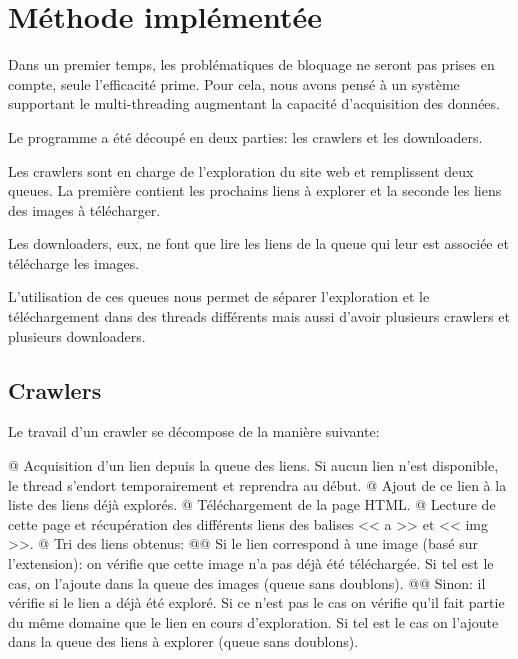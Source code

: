 \documentclass[hideweeklyreports,noposter]{polytech/polytech}
\begin{document}
		\section{Méthode implémentée}
			Dans un premier temps, les problématiques de bloquage ne seront pas prises en compte, seule l'efficacité prime.
			Pour cela, nous avons pensé à un système supportant le multi-threading augmentant la capacité d'acquisition des données.
			
			Le programme a été découpé en deux parties: les crawlers et les downloaders.
			
			Les crawlers sont en charge de l'exploration du site web et remplissent deux queues.
			La première contient les prochains liens à explorer et la seconde les liens des images à télécharger.
			
			Les downloaders, eux, ne font que lire les liens de la queue qui leur est associée et télécharge les images.
			
			L'utilisation de ces queues nous permet de séparer l'exploration et le téléchargement dans des threads différents mais aussi d'avoir plusieurs crawlers et plusieurs downloaders.
			
			\subsection{Crawlers}
				Le travail d'un crawler se décompose de la manière suivante:
				\begin{easylist}
					@ Acquisition d'un lien depuis la queue des liens.
					Si aucun lien n'est disponible, le thread s'endort temporairement et reprendra au début.
					@ Ajout de ce lien à la liste des liens déjà explorés.
					@ Téléchargement de la page HTML.
					@ Lecture de cette page et récupération des différents liens des balises << a >> et << img >>.
					@ Tri des liens obtenus:
					@@ Si le lien correspond à une image (basé sur l'extension): on vérifie que cette image n'a pas déjà été téléchargée.
					Si tel est le cas, on l'ajoute dans la queue des images (queue sans doublons).
					@@ Sinon: il vérifie si le lien a déjà été exploré.
					Si ce n'est pas le cas on vérifie qu'il fait partie du même domaine que le lien en cours d'exploration.
					Si tel est le cas on l'ajoute dans la queue des liens à explorer (queue sans doublons).
				\end{easylist}
			
\end{document}

